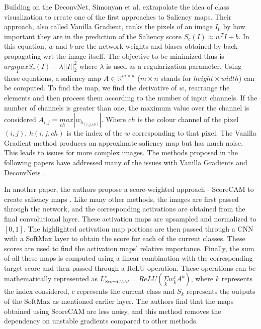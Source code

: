 Building on the DeconvNet, Simonyan et al. \cite{simonyanDeepConvolutionalNetworks2014} extrapolate the idea of class visualization to create one of the first approaches to Saliency maps. Their approach, also called Vanilla Gradient, ranks the pixels of an image $I_{0}$ by how important they are in the prediction of the Saliency score $S_{c}(I) \approx w^{T}I + b$. In this equation, $w$ and $b$ are the network weights and biases obtained by back-propagating wrt the image itself. The objective to be minimized thus is $arg \underset{I}max S_{c}(I) - \lambda||I||^{2}_{2}$ where $\lambda$ is used as a regularization parameter. Using these equations, a saliency map $A \in \mathbb{R}^{m \times n}$ ($m \times n$ stands for $height \times width$) can be computed. To find the map, we find the derivative of $w$, rearrange the elements and then process them according to the number of input channels. If the number of channels is greater than one, the maximum value over the channel is considered $A_{i,j}= \underset{ch}max |w_{h_{(i,j, ch)}}|$. Where $ch$ is the colour channel of the pixel $(i,j)$, $h(i,j, ch)$ is the index of the $w$ corresponding to that pixel. The Vanilla Gradient method produces an approximate saliency map but has much noise. This leads to issues for more complex images. The methods proposed in the following papers have addressed many of the issues with Vanilla Gradients and DeconvNets \cite{zeilerVisualizingUnderstandingConvolutional2013}.

In another paper, the authors propose a score-weighted approach - ScoreCAM to create saliency maps \cite{wangScoreCAMScoreWeightedVisual2020}. Like many other methods, the images are first passed through the network, and the corresponding activations are obtained from the final convolutional layer. These activation maps are upsampled and normalized to $[0,1]$. The highlighted activation map portions are then passed through a CNN with a SoftMax layer to obtain the score for each of the current classes. These scores are used to find the activation maps' relative importance. Finally, the sum of all these maps is computed using a linear combination with the corresponding target score and then passed through a ReLU operation. These operations can be mathematically represented as $L^{c}_{ScoreCAM} = ReLU(\underset{k}\Sigma w_{k}^{c}A^{k})$, where $k$ represents the index considered, $c$ represents the current class and $S_k$ represents the outputs of the SoftMax as mentioned earlier layer. The authors find that the maps obtained using ScoreCAM are less noisy, and this method removes the dependency on unstable gradients compared to other methods.

